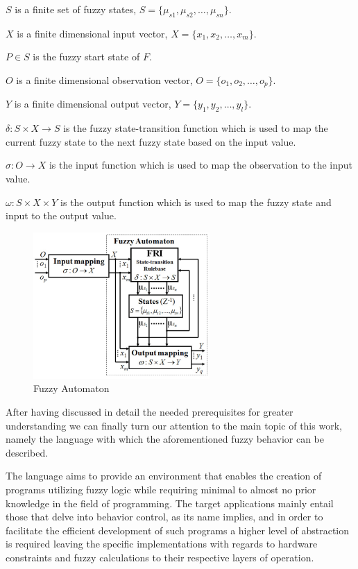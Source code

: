 \hspace*{0.5cm}%
\begin{minipage}{.8\textwidth}%
       $S$ is a finite set of fuzzy states, $S = \{\mu_{s1}, \mu_{s2}, \ldots, \mu_{sn}\}$.

      $X$ is a finite dimensional input vector, $X = \{x_1, x_2, \ldots, x_m\}$.

      $P \in S$ is the fuzzy start state of $F$.
      
     $O$ is a finite dimensional observation vector, $O = \{o_1, o_2, \ldots, o_p\}$.
	
	$Y$ is a finite dimensional output vector, $Y = \{y_1, y_2, \ldots, y_l\}$.
	
	$\delta : S \times X \rightarrow S$ is the fuzzy state-transition function which is used to map the current fuzzy state to the next fuzzy state based on the input value.
	
	$\sigma : O \rightarrow X$ is the input function which is used to map the observation to the input value.
	
	$\omega : S \times X \times Y$ is the output function which is used to map the fuzzy state and input to the output value.
\end{minipage}%

\begin{figure}[!h]
	\centering
	\includegraphics[width=0.6\textwidth]{images/fuzzy_automaton}
	\caption{Fuzzy Automaton}
\end{figure}

After having discussed in detail the needed prerequisites for greater understanding we can finally turn our attention to the main topic of this work, namely the language with which the aforementioned fuzzy behavior can be described. 


The language aims to provide an environment that enables the creation of programs utilizing fuzzy logic while requiring minimal to almost no prior knowledge in the field of programming. The target applications mainly entail those that delve into behavior control, as its name implies, and in order to facilitate the efficient development of such programs a higher level of abstraction is required leaving the specific implementations with regards to hardware constraints and fuzzy calculations to their respective layers of operation.

